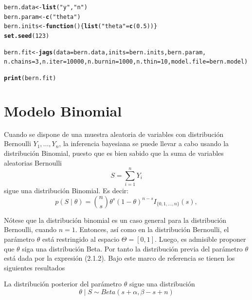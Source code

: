 \documentclass[10pt,openright]{book}\usepackage[]{graphicx}\usepackage[]{color}
\makeatletter
\newcommand{\hlnum}[1]{\textcolor[rgb]{0.686,0.059,0.569}{#1}}%
\newcommand{\hlstr}[1]{\textcolor[rgb]{0.192,0.494,0.8}{#1}}%
\newcommand{\hlstd}[1]{\textcolor[rgb]{0.345,0.345,0.345}{#1}}%
\newcommand{\hlkwa}[1]{\textcolor[rgb]{0.161,0.373,0.58}{\textbf{#1}}}%
\newcommand{\hlkwb}[1]{\textcolor[rgb]{0.69,0.353,0.396}{#1}}%
\newcommand{\hlkwc}[1]{\textcolor[rgb]{0.333,0.667,0.333}{#1}}%
\newcommand{\hlkwd}[1]{\textcolor[rgb]{0.737,0.353,0.396}{\textbf{#1}}}%
\newenvironment{kframe}{%
 \def\at@end@of@kframe{}%
 \ifinner\ifhmode%
  \def\at@end@of@kframe{\end{minipage}}%
  \begin{minipage}{\columnwidth}%
 \fi\fi%
 \def\FrameCommand##1{\hskip\@totalleftmargin \hskip-\fboxsep
 \colorbox{shadecolor}{##1}\hskip-\fboxsep
     \hskip-\linewidth \hskip-\@totalleftmargin \hskip\columnwidth}%
 \MakeFramed {\advance\hsize-\width
   \@totalleftmargin\z@ \linewidth\hsize
   \@setminipage}}%
 {\par\unskip\endMakeFramed%
 \at@end@of@kframe}
\newenvironment{knitrout}{}{} %
\makeatother
\begin{document}
\begin{Eje}
\begin{knitrout}
\begin{kframe}
\begin{alltt}
\hlstd{bern.data} \hlkwb{<-} \hlkwd{list}\hlstd{(}\hlstr{"y"}\hlstd{,}\hlstr{"n"}\hlstd{)}
\hlstd{bern.param} \hlkwb{<-} \hlkwd{c}\hlstd{(}\hlstr{"theta"}\hlstd{)}
\hlstd{bern.inits} \hlkwb{<-} \hlkwa{function}\hlstd{()\{}\hlkwd{list}\hlstd{(}\hlstr{"theta"}\hlstd{=}\hlkwd{c}\hlstd{(}\hlnum{0.5}\hlstd{))\}}
\hlkwd{set.seed}\hlstd{(}\hlnum{123}\hlstd{)}

\hlstd{bern.fit} \hlkwb{<-} \hlkwd{jags}\hlstd{(}\hlkwc{data}\hlstd{=bern.data,} \hlkwc{inits}\hlstd{=bern.inits, bern.param,}
\hlkwc{n.chains}\hlstd{=}\hlnum{3}\hlstd{,} \hlkwc{n.iter}\hlstd{=}\hlnum{10000}\hlstd{,} \hlkwc{n.burnin}\hlstd{=}\hlnum{1000}\hlstd{,} \hlkwc{n.thin}\hlstd{=}\hlnum{10}\hlstd{,} \hlkwc{model.file}\hlstd{=bern.model)}

\hlkwd{print}\hlstd{(bern.fit)}
\end{alltt}
\end{kframe}
\end{knitrout}
    \end{Eje}
    
    \section{Modelo Binomial}
    
    Cuando se dispone de una muestra aleatoria de variables con distribuci\'on Bernoulli $Y_1,\ldots,Y_n$, la inferencia bayesiana se puede llevar a cabo usando la distribuci\'on Binomial, puesto que es bien sabido que la suma de variables aleatorias Bernoulli
    \begin{equation*}
    S=\sum_{i=1}^nY_i
    \end{equation*}
    sigue una distribuci\'on Binomial. Es decir:
    \begin{equation}
    p(S \mid \theta)=\binom{n}{s}\theta^s(1-\theta)^{n-s}I_{\{0,1,\ldots,n\}}(s),
    \end{equation}
    
    N\'otese que la distribuci\'on binomial es un caso general para la distribuci\'on Bernoulli, cuando $n=1$. Entonces, as\'i como en la distribuci\'on Bernoulli, el par\'ametro $\theta$ est\'a restringido al espacio $\Theta=[0,1]$. Luego, es admisible proponer que $\theta$ siga una distribuci\'on Beta. Por tanto la distribuci\'on previa del par\'ametro $\theta$ est\'a dada por la expresi\'on (2.1.2). Bajo este marco de referencia se tienen los siguientes resultados
    
    \begin{Res}
    La distribuci\'on posterior del par\'ametro $\theta$ sigue una distribuci\'on
    \begin{equation*}
    \theta \mid S \sim Beta(s+\alpha,\beta-s+n)
    \end{equation*}
    \end{Res}
    
\end{document}
